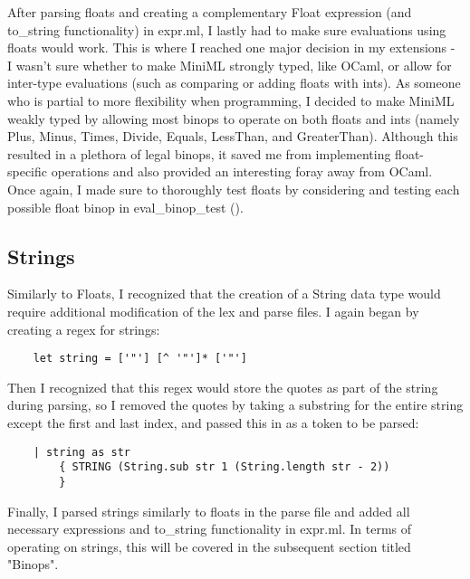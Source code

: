 \documentclass{article}
\begin{document}
After parsing floats and creating a complementary Float expression (and to\_string functionality) in expr.ml, I lastly had to make sure evaluations using floats would work. This is where I reached one major decision in my extensions - I wasn't sure whether to make MiniML strongly typed, like OCaml, or allow for inter-type evaluations (such as comparing or adding floats with ints). As someone who is partial to more flexibility when programming, I decided to make MiniML weakly typed by allowing most binops to operate on both floats and ints (namely Plus, Minus, Times, Divide, Equals, LessThan, and GreaterThan). Although this resulted in a plethora of legal binops, it saved me from implementing float-specific operations and also provided an interesting foray away from OCaml. Once again, I made sure to thoroughly test floats by considering and testing each possible float binop in eval\_binop\_test (). 

\subsection*{Strings}
Similarly to Floats, I recognized that the creation of a String data type would require additional modification of the lex and parse files. I again began by creating a regex for strings:
\begin{verbatim}
    let string = ['"'] [^ '"']* ['"']
\end{verbatim}
Then I recognized that this regex would store the quotes as part of the string during parsing, so I removed the quotes by taking a substring for the entire string except the first and last index, and passed this in as a token to be parsed: 
\begin{verbatim}
    | string as str 
        { STRING (String.sub str 1 (String.length str - 2)) 
        }
\end{verbatim}
Finally, I parsed strings similarly to floats in the parse file and added all necessary expressions and to\_string functionality in expr.ml. In terms of operating on strings, this will be covered in the subsequent section titled "Binops".

\pagebreak
\end{document}
